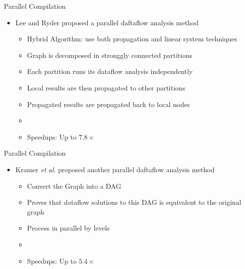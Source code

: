 \begin{frame}{Parallel Compilation}
\begin{itemize}
    \item Lee and Ryder \cite{lee1994} proposed a parallel daftaflow analysis method
    \begin{itemize}
        \item Hybrid Algorithm: use both propagation and linear system techniques
        \item Graph is decomposed in stronggly connected partitions
        \item Each partition runs its dataflow analysis independently
        \item Local results are then propagated to other partitions
        \item Propagated results are propagated back to local nodes
        \item[]
        \item Speedups: Up to $7.8\times$
    \end{itemize}
\end{itemize}
\end{frame}


\begin{frame}{Parallel Compilation}
\begin{itemize}
    \item Kramer \textit{et al.} \cite{krammer1994combining} proposed another parallel daftaflow analysis method
    \begin{itemize}
        \item Convert the Graph into a DAG
        \item Proves that dataflow solutions to this DAG is equivalent to the original graph
        \item Process in parallel by levels
        \item[]
        \item Speedups: Up to $5.4\times$
    \end{itemize}
\end{itemize}
\end{frame}


